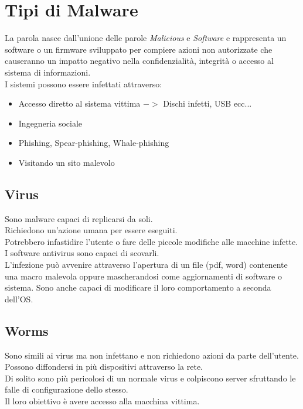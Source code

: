 \section{Tipi di Malware}
\label{sec:malwaretypes}
La parola  nasce dall'unione delle parole \textit{Malicious} e \textit{Software} e rappresenta un software o un firmware sviluppato per compiere azioni non autorizzate che causeranno un impatto negativo nella confidenzialità, integrità o accesso al sistema di informazioni.\\
I sistemi possono essere infettati attraverso:
\begin{itemize}[noitemsep]
    \item Accesso diretto al sistema vittima $->$ Dischi infetti, USB ecc...
    \item Ingegneria sociale
    \item Phishing, Spear-phishing, Whale-phishing
    \item Visitando un sito malevolo
\end{itemize}

\subsection{Virus}
Sono malware capaci di replicarsi da soli.\\
Richiedono un'azione umana per essere eseguiti.\\
Potrebbero infastidire l'utente o fare delle piccole modifiche alle macchine infette.\\
I software antivirus sono capaci di scovarli.\\
L'infezione può avvenire attraverso l'apertura di un file (pdf, word) contenente una macro malevola oppure mascherandosi come aggiornamenti di software o sistema.
Sono anche capaci di modificare il loro comportamento a seconda dell'\acrshort{OS}.

\subsection{Worms}
Sono simili ai virus ma non infettano e non richiedono azioni da parte dell'utente.\\
Possono diffondersi in più dispositivi attraverso la rete.\\
Di solito sono più pericolosi di un normale virus e colpiscono server sfruttando le falle di configurazione dello stesso.\\
Il loro obiettivo è avere accesso alla macchina vittima.

